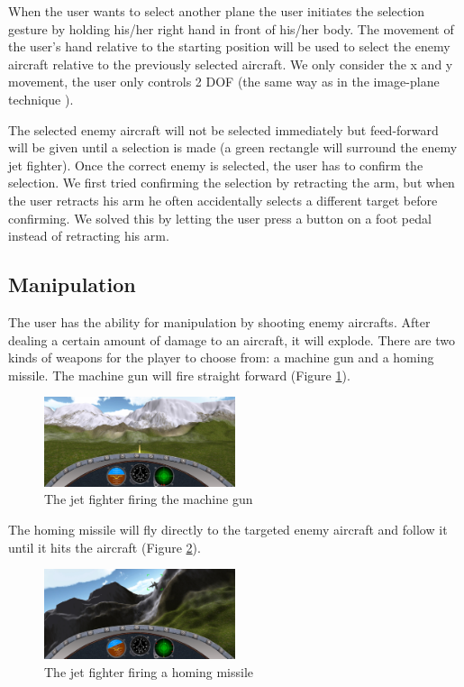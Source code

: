 \documentclass{acm_proc_article-sp}
\begin{document}
When the user wants to select another plane the user initiates the selection gesture by holding his/her right hand in front of his/her body.
The movement of the user's hand relative to the starting position will be used to select the enemy aircraft relative to the previously selected aircraft. We only consider the x and y movement, the user only controls 2 DOF (the same way as in the image-plane technique \cite{bookimageplane}).

The selected enemy aircraft will not be selected immediately but feed-forward will be given until a selection is made (a green rectangle will surround the enemy jet fighter). Once the correct enemy is selected, the user has to confirm the selection.
We first tried confirming the selection by retracting the arm, but when the user retracts his arm he often accidentally selects a different target before confirming. We solved this by letting the user press a button on a foot pedal instead of retracting his arm.

\subsection{Manipulation}
The user has the ability for manipulation by shooting enemy aircrafts. After dealing a certain amount of damage to an aircraft, it will explode. There are two kinds of weapons for the player to choose from: a machine gun and a homing missile. The machine gun will fire straight forward (Figure \ref{machinegun}).
\begin{figure}[ht]
\centering
\includegraphics[width=0.5\textwidth ,keepaspectratio=true]{./img/machineGun.jpg}
 \caption{The jet fighter firing the machine gun}
 \label{machinegun}
\end{figure}

The homing missile will fly directly to the targeted enemy aircraft and follow it until it hits the aircraft (Figure \ref{missile}).
\begin{figure}[t]
\centering
\includegraphics[width=0.5\textwidth ,keepaspectratio=true]{./img/missile.jpg}
\caption{The jet fighter firing a homing missile}
 \label{missile}
\end{figure}
\end{document}
